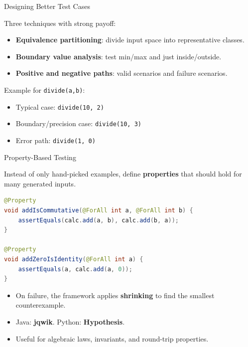 \documentclass[11pt, xcolor=svgnames]{beamer}
\providecommand{\alert}[1]{\textbf{#1}}
\begin{document}

\begin{frame}{Designing Better Test Cases}

Three techniques with strong payoff:

\begin{itemize}
  \item \alert{Equivalence partitioning}: divide input space into representative classes.
  \item \alert{Boundary value analysis}: test min/max and just inside/outside.
  \item \alert{Positive and negative paths}: valid scenarios and failure scenarios.
\end{itemize}

Example for \texttt{divide(a,b)}:
\begin{itemize}
  \item Typical case: \texttt{divide(10, 2)}
  \item Boundary/precision case: \texttt{divide(10, 3)}
  \item Error path: \texttt{divide(1, 0)}
\end{itemize}

\end{frame}


\begin{frame}[fragile]{Property-Based Testing}

Instead of only hand-picked examples, define \alert{properties} that should hold
for many generated inputs.

\begin{lstlisting}[language=Java,basicstyle=\scriptsize]
@Property
void addIsCommutative(@ForAll int a, @ForAll int b) {
    assertEquals(calc.add(a, b), calc.add(b, a));
}

@Property
void addZeroIsIdentity(@ForAll int a) {
    assertEquals(a, calc.add(a, 0));
}
\end{lstlisting}

\begin{itemize}
  \item On failure, the framework applies \alert{shrinking} to find the smallest
        counterexample.
  \item Java: \textbf{jqwik}. \quad Python: \textbf{Hypothesis}.
  \item Useful for algebraic laws, invariants, and round-trip properties.
\end{itemize}

\end{frame}
\end{document}

